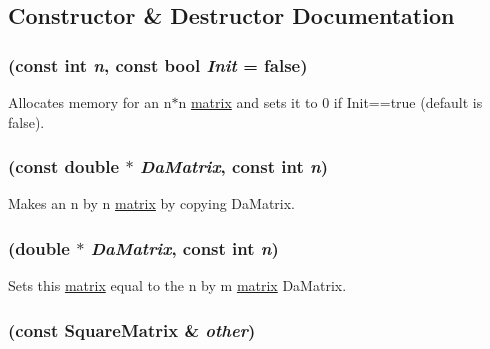 \subsection{Constructor \& Destructor Documentation}
\hypertarget{classJKBuilder_1_1SquareMatrix_af755a00337cbb65c3456c2d2c80cdb08}{
\subsubsection[{SquareMatrix}]{ (const int {\em n}, \/  const bool {\em Init} = {\ttfamily false})}}
\label{classJKBuilder_1_1SquareMatrix_af755a00337cbb65c3456c2d2c80cdb08}


Allocates memory for an n$\ast$n \hyperlink{classJKBuilder_1_1matrix}{matrix} and sets it to 0 if Init==true (default is false). \hypertarget{classJKBuilder_1_1SquareMatrix_a9b4d71581dc48d35a53e3e63a86be2b0}{
\subsubsection[{SquareMatrix}]{ (const double $\ast$ {\em DaMatrix}, \/  const int {\em n})}}
\label{classJKBuilder_1_1SquareMatrix_a9b4d71581dc48d35a53e3e63a86be2b0}


Makes an n by n \hyperlink{classJKBuilder_1_1matrix}{matrix} by copying DaMatrix. \hypertarget{classJKBuilder_1_1SquareMatrix_adfb34b7570c1de2cf7b96ba76fde9b01}{
\subsubsection[{SquareMatrix}]{ (double $\ast$ {\em DaMatrix}, \/  const int {\em n})}}
\label{classJKBuilder_1_1SquareMatrix_adfb34b7570c1de2cf7b96ba76fde9b01}


Sets this \hyperlink{classJKBuilder_1_1matrix}{matrix} equal to the n by m \hyperlink{classJKBuilder_1_1matrix}{matrix} DaMatrix. \hypertarget{classJKBuilder_1_1SquareMatrix_a2ef83e63ad627a33ea913bc245f00f43}{
\subsubsection[{SquareMatrix}]{ (const {\bf SquareMatrix} \& {\em other})}}
\label{classJKBuilder_1_1SquareMatrix_a2ef83e63ad627a33ea913bc245f00f43}



